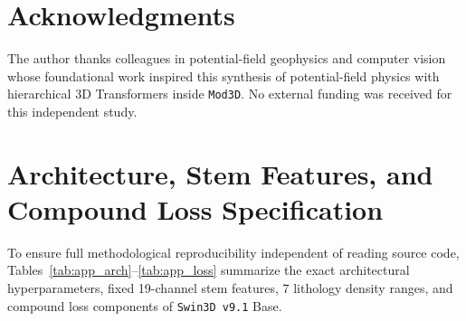 \documentclass[11pt,a4paper]{article}
\begin{document}
\section*{Acknowledgments}
The author thanks colleagues in potential-field geophysics and computer vision whose foundational work inspired this synthesis of potential-field physics with hierarchical 3D Transformers inside \texttt{Mod3D}. No external funding was received for this independent study.




\clearpage
\appendix
\section{Architecture, Stem Features, and Compound Loss Specification}
\label{app:specs}

To ensure full methodological reproducibility independent of reading source code, Tables~\ref{tab:app_arch}--\ref{tab:app_loss} summarize the exact architectural hyperparameters, fixed 19-channel stem features, 7 lithology density ranges, and compound loss components of \texttt{Swin3D v9.1} Base.

\begin{table}[ht]
\centering
\caption{Exact architectural dimensions and training hyperparameters of \texttt{Swin3D v9.1} Base (\valVNineOneParamsExact{} parameters).}
\label{tab:app_arch}
\small
{}
\end{table}
\end{document}

